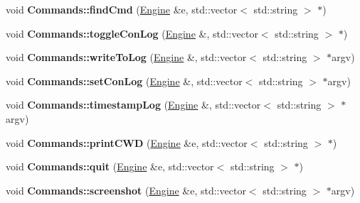 \begin{DoxyCompactItemize}
\item 
void {\bfseries Commands\+::find\+Cmd} (\hyperlink{classEngine}{Engine} \&e, std\+::vector$<$ std\+::string $>$ $\ast$)\hypertarget{Commands_8hh_a5a9b5986047b6c3857a47309939338ea}{}\label{Commands_8hh_a5a9b5986047b6c3857a47309939338ea}

\item 
void {\bfseries Commands\+::toggle\+Con\+Log} (\hyperlink{classEngine}{Engine} \&, std\+::vector$<$ std\+::string $>$ $\ast$)\hypertarget{Commands_8hh_a29033c5de8eb9b3a459cce0af1b682e1}{}\label{Commands_8hh_a29033c5de8eb9b3a459cce0af1b682e1}

\item 
void {\bfseries Commands\+::write\+To\+Log} (\hyperlink{classEngine}{Engine} \&, std\+::vector$<$ std\+::string $>$ $\ast$argv)\hypertarget{Commands_8hh_abc6221d6db875de6393274c79050dc50}{}\label{Commands_8hh_abc6221d6db875de6393274c79050dc50}

\item 
void {\bfseries Commands\+::set\+Con\+Log} (\hyperlink{classEngine}{Engine} \&, std\+::vector$<$ std\+::string $>$ $\ast$argv)\hypertarget{Commands_8hh_a0b95e01fe5e51b1f1b7442169d22d016}{}\label{Commands_8hh_a0b95e01fe5e51b1f1b7442169d22d016}

\item 
void {\bfseries Commands\+::timestamp\+Log} (\hyperlink{classEngine}{Engine} \&, std\+::vector$<$ std\+::string $>$ $\ast$argv)\hypertarget{Commands_8hh_a02b2eb6659d7cf38798162dfae520105}{}\label{Commands_8hh_a02b2eb6659d7cf38798162dfae520105}

\item 
void {\bfseries Commands\+::print\+C\+WD} (\hyperlink{classEngine}{Engine} \&e, std\+::vector$<$ std\+::string $>$ $\ast$)\hypertarget{Commands_8hh_a78e83af80e189d307c49aa8db740b605}{}\label{Commands_8hh_a78e83af80e189d307c49aa8db740b605}

\item 
void {\bfseries Commands\+::quit} (\hyperlink{classEngine}{Engine} \&e, std\+::vector$<$ std\+::string $>$ $\ast$)\hypertarget{Commands_8hh_a25cfa3c76d0c7519d6fa7b3cee3bbd7d}{}\label{Commands_8hh_a25cfa3c76d0c7519d6fa7b3cee3bbd7d}

\item 
void {\bfseries Commands\+::screenshot} (\hyperlink{classEngine}{Engine} \&e, std\+::vector$<$ std\+::string $>$ $\ast$argv)\hypertarget{Commands_8hh_aa9cc2524a0648b744eedcb0714d89002}{}\label{Commands_8hh_aa9cc2524a0648b744eedcb0714d89002}


\end{DoxyCompactItemize}
